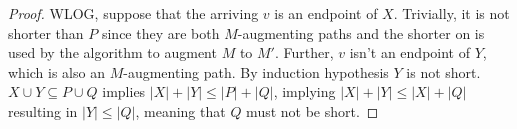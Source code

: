 \begin{proof}
	WLOG, suppose that the arriving $v$ is an endpoint of $X$. Trivially, it is not shorter than $P$ since they are both $M$-augmenting paths and the shorter on is used by the algorithm to augment $M$ to $M'$. Further, $v$ isn't an endpoint of $Y$, which is also an $M$-augmenting path. By induction hypothesis $Y$ is not short. $X\cup Y\subseteq P\cup Q$ implies $|X|+|Y|\leq|P|+|Q|$, implying $|X|+|Y|\leq|X|+|Q|$ resulting in $|Y|\leq|Q|$, meaning that $Q$ must not be short.
\end{proof}